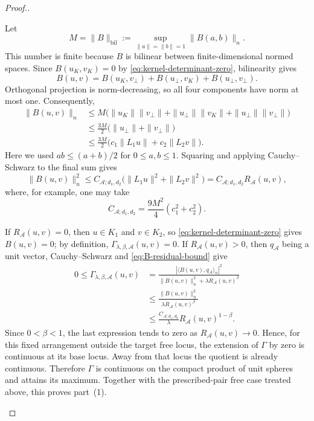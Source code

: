 \documentclass[pdflatex,sn-mathphys-num]{sn-jnl}%
\theoremstyle{remark}
\theoremstyle{definition}
\begin{document}
\begin{proof}[Proof.]
\begin{itemize}
Let
\[
M=\|B\|_{\mathrm{bil}}
:=
\sup_{\|a\|=\|b\|=1}\|B(a,b)\|_n.
\]
This number is finite because $B$ is bilinear between finite-dimensional normed spaces. Since $B(u_K,v_K)=0$ by \eqref{eq:kernel-determinant-zero}, bilinearity gives
\[
B(u,v)
=
B(u_K,v_\perp)
+B(u_\perp,v_K)
+B(u_\perp,v_\perp).
\]
Orthogonal projection is norm-decreasing, so all four components have norm at most one. Consequently,
\begin{align*}
\|B(u,v)\|_n
&\leq
M\bigl(
\|u_K\|\|v_\perp\|
+\|u_\perp\|\|v_K\|
+\|u_\perp\|\|v_\perp\|
\bigr)\\
&\leq
\frac{3M}{2}
\bigl(\|u_\perp\|+\|v_\perp\|\bigr)\\
&\leq
\frac{3M}{2}
\bigl(c_1\|L_1u\|+c_2\|L_2v\|\bigr).
\end{align*}
Here we used $ab\leq(a+b)/2$ for $0\leq a,b\leq1$. Squaring and applying Cauchy--Schwarz to the final sum gives
\begin{equation}
\label{eq:B-residual-bound}
\|B(u,v)\|_n^2
\leq
C_{\mathcal{A};d_1,d_2}
\bigl(\|L_1u\|^2+\|L_2v\|^2\bigr)
=
C_{\mathcal{A};d_1,d_2}R_{\mathcal{A}}(u,v),
\end{equation}
where, for example, one may take
\[
C_{\mathcal{A};d_1,d_2}
=
\frac{9M^2}{4}(c_1^2+c_2^2).
\]

If $R_{\mathcal{A}}(u,v)=0$, then $u\in K_1$ and $v\in K_2$, so \eqref{eq:kernel-determinant-zero} gives $B(u,v)=0$; by definition, $\Gamma_{\lambda,\beta,\mathcal{A}}(u,v)=0$. If $R_{\mathcal{A}}(u,v)>0$, then $q_{\mathcal{A}}$ being a unit vector, Cauchy--Schwarz and \eqref{eq:B-residual-bound} give
\begin{align}
0\leq\Gamma_{\lambda,\beta,\mathcal{A}}(u,v)
&=
\frac{|\langle B(u,v),q_{\mathcal{A}}\rangle_n|^2}
{\|B(u,v)\|_n^2+\lambda R_{\mathcal{A}}(u,v)^\beta}
\nonumber\\
&\leq
\frac{\|B(u,v)\|_n^2}
{\lambda R_{\mathcal{A}}(u,v)^\beta}
\nonumber\\
&\leq
\frac{C_{\mathcal{A};d_1,d_2}}{\lambda}
R_{\mathcal{A}}(u,v)^{1-\beta}.
\label{eq:Gamma-base-bound}
\end{align}
Since $0<\beta<1$, the last expression tends to zero as $R_{\mathcal{A}}(u,v)\to0$. Hence, for this fixed arrangement outside the target free locus, the extension of $\Gamma$ by zero is continuous at its base locus. Away from that locus the quotient is already continuous. Therefore $\Gamma$ is continuous on the compact product of unit spheres and attains its maximum. Together with the prescribed-pair free case treated above, this proves part~(1).



\end{itemize}
\end{proof}
\end{document}
